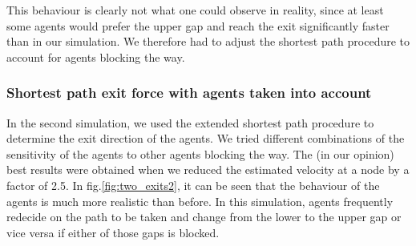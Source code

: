 \documentclass[11pt]{article}
\begin{document}
This behaviour is clearly not what one could observe in reality, since at least some agents would prefer the upper gap and reach the exit significantly faster than in our simulation. We therefore had to adjust the shortest path procedure to account for agents blocking the way.
\subsubsection{Shortest path exit force with agents taken into account}
In the second simulation, we used the extended shortest path procedure to determine the exit direction of the agents. We tried different combinations of the sensitivity of the agents to other agents blocking the way. The (in our opinion) best results were obtained when we reduced the estimated velocity at a node by a factor of 2.5. In fig.\ref{fig:two_exits2}, it can be seen that the behaviour of the agents is much more realistic than before. In this simulation, agents frequently redecide on the path to be taken and change from the lower to the upper gap or vice versa if either of those gaps is blocked.
\end{document}
